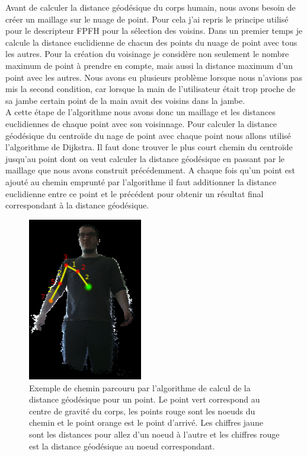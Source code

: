 Avant de calculer la distance géodésique du corps humain, nous avons besoin de créer un maillage sur le nuage de point. Pour cela
j'ai repris le principe utilisé pour le descripteur FPFH\cite{FPFH} pour la sélection des voisins. Dans un premier temps je calcule
la distance euclidienne de chacun des points du nuage de point avec tous les autres. Pour la création du voisinage je considère non
seulement le nombre maximum de point à prendre en compte, mais aussi la distance maximum d'un point avec les autres. Nous avons eu
plusieurs problème lorsque nous n'avions pas mis la second condition, car lorsque la main de l'utilisateur était trop proche de sa 
jambe certain point de la main avait des voisins dans la jambe.\\


A cette étape de l'algorithme nous avons donc un maillage et les distances euclidiennes de chaque point avec son voisinnage. Pour calculer
la distance géodésique du centroïde du nage de point avec chaque point nous allons utilisé l'algorithme de Dijkstra\cite{dijkstra}.
Il faut donc trouver le plus court chemin du centroïde jusqu'au point dont on veut calculer la distance géodésique en passant par le
maillage que nous avons construit précédemment. A chaque fois qu'un point est ajouté au chemin emprunté par l'algorithme il faut 
additionner la distance euclidienne entre ce point et le précédent pour obtenir un résultat final correspondant à la distance 
géodésique.\\

\begin{figure}[!ht]
  \begin{center}
    \includegraphics[width=5cm]{image/cheminGeodesique.PNG}
    \caption{Exemple de chemin parcouru par l'algorithme de calcul de la distance géodésique pour un point.
    Le point vert correspond au centre de gravité du corps, les points rouge sont les noeuds du chemin et le point 
    orange est le point d'arrivé. Les chiffres jaune sont les distances pour allez d'un noeud à l'autre et les chiffres
    rouge est la distance géodésique au noeud correspondant.}
    \label{fig:cheminGeodesique}
  \end{center}
\end{figure}

